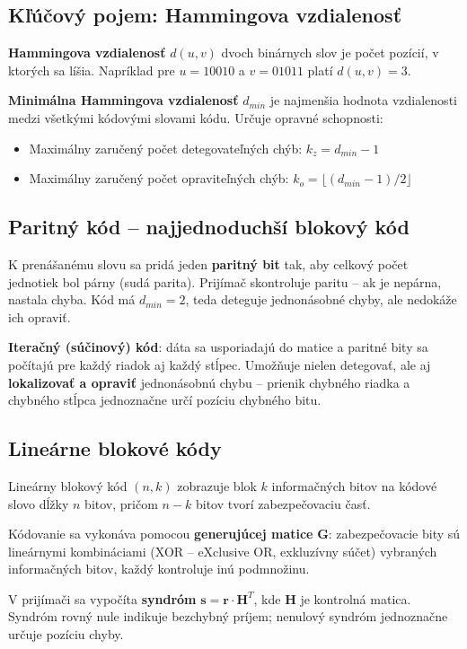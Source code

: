 \subsection{Kľúčový pojem: Hammingova vzdialenosť}

\textbf{Hammingova vzdialenosť} $d(u, v)$ dvoch binárnych slov je počet pozícií,
v ktorých sa líšia. Napríklad pre $u = 10010$ a $v = 01011$ platí $d(u,v) = 3$.

\textbf{Minimálna Hammingova vzdialenosť} $d_{min}$ je najmenšia hodnota vzdialenosti
medzi všetkými kódovými slovami kódu. Určuje opravné schopnosti:
\begin{itemize}
    \item Maximálny zaručený počet detegovateľných chýb: $k_z = d_{min} - 1$
    \item Maximálny zaručený počet opraviteľných chýb: $k_o = \lfloor(d_{min}-1)/2\rfloor$
\end{itemize}

\subsection{Paritný kód -- najjednoduchší blokový kód}

K prenášanému slovu sa pridá jeden \textbf{paritný bit} tak, aby celkový počet
jednotiek bol párny (sudá parita). Prijímač skontroluje paritu -- ak je nepárna,
nastala chyba. Kód má $d_{min} = 2$, teda deteguje jednonásobné chyby, ale
nedokáže ich opraviť.

\textbf{Iteračný (súčinový) kód}: dáta sa usporiadajú do matice a paritné bity
sa počítajú pre každý riadok aj každý stĺpec. Umožňuje nielen detegovať, ale aj
\textbf{lokalizovať a opraviť} jednonásobnú chybu -- prienik chybného riadka a
chybného stĺpca jednoznačne určí pozíciu chybného bitu.

\subsection{Lineárne blokové kódy}

Lineárny blokový kód $(n, k)$ zobrazuje blok $k$ informačných bitov na kódové
slovo dĺžky $n$ bitov, pričom $n - k$ bitov tvorí zabezpečovaciu časť.

Kódovanie sa vykonáva pomocou \textbf{generujúcej matice} $\mathbf{G}$:
zabezpečovacie bity sú lineárnymi kombináciami (XOR -- eXclusive OR, exkluzívny
súčet) vybraných informačných bitov, každý kontroluje inú podmnožinu.

V prijímači sa vypočíta \textbf{syndróm} $\mathbf{s} = \mathbf{r} \cdot \mathbf{H}^T$,
kde $\mathbf{H}$ je kontrolná matica. Syndróm rovný nule indikuje bezchybný príjem;
nenulový syndróm jednoznačne určuje pozíciu chyby.

